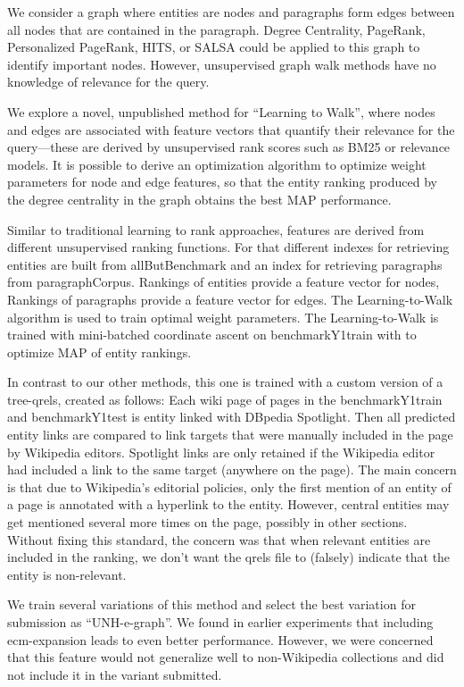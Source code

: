 \documentclass{article}
\begin{document}
We consider a graph where entities are nodes and paragraphs form edges between all nodes that are contained in the paragraph. Degree Centrality, PageRank, Personalized PageRank, HITS, or SALSA could be applied to this graph to identify important nodes. However, unsupervised graph walk methods have no knowledge of relevance for the query. 

We explore a novel, unpublished method for ``Learning to Walk'', where nodes and edges are associated with feature vectors that quantify their relevance for the query---these are derived by unsupervised rank scores such as BM25 or relevance models. It is possible to derive an optimization algorithm to optimize weight parameters for node and edge features, so that the entity ranking produced by the degree centrality in the graph obtains the best MAP performance.

Similar to traditional learning to rank approaches, features are derived from different unsupervised ranking functions. 
For that different indexes for retrieving entities  are built from allButBenchmark and an index for retrieving paragraphs from  paragraphCorpus. Rankings of entities provide a feature vector for nodes, Rankings of paragraphs provide a feature vector for edges.  The Learning-to-Walk algorithm is used to train optimal weight parameters. The Learning-to-Walk is trained with mini-batched coordinate ascent on benchmarkY1train with to optimize MAP of entity rankings.

In contrast to our other methods, this one is trained with a custom version of a tree-qrels, created as follows: Each wiki page of pages in the benchmarkY1train and benchmarkY1test is entity linked with DBpedia Spotlight. Then all predicted entity links are compared to link targets that were manually included in the page by Wikipedia editors. Spotlight links are only retained if the Wikipedia editor had included a link to the same target (anywhere on the page).  The main concern is that due to Wikipedia's editorial policies, only the first mention of an entity of a page is annotated with a hyperlink to the entity. However, central entities may get mentioned several more times on the page, possibly in other sections. Without fixing this standard, the concern was that when relevant entities are included in the ranking, we don't want the qrels file to (falsely) indicate that the entity is non-relevant.

We train several variations of this method and select the best variation for submission as ``UNH-e-graph''. We found in earlier experiments that including ecm-expansion leads to even better performance. However, we were concerned that this feature would not generalize well to non-Wikipedia collections and did not include it in the variant submitted.
\end{document}
